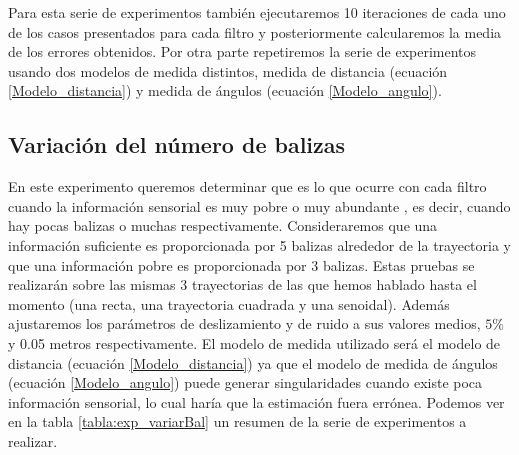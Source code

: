 Para esta serie de experimentos también ejecutaremos 10 iteraciones de cada uno de los casos presentados para cada filtro y posteriormente calcularemos la media de los errores obtenidos.
Por otra parte repetiremos la serie de experimentos usando dos modelos de medida distintos, medida de distancia (ecuación \ref{Modelo_distancia}) y medida de ángulos (ecuación \ref{Modelo_angulo}).

\subsection{Variación del número de balizas }
%
%
%
En este experimento queremos determinar que es lo que ocurre con cada filtro cuando la información sensorial es muy pobre o muy abundante , es decir, cuando hay pocas balizas o muchas respectivamente.
Consideraremos que una información suficiente es proporcionada por 5 balizas alrededor de la trayectoria y que una información pobre es proporcionada por 3 balizas.
Estas pruebas se realizarán sobre las mismas 3 trayectorias de las que hemos hablado hasta el momento (una recta, una trayectoria cuadrada y una senoidal).
Además ajustaremos los parámetros de deslizamiento y de ruido a sus valores medios, $5\%$ y 0.05 metros respectivamente.
El modelo de medida utilizado será el modelo de distancia (ecuación \ref{Modelo_distancia}) ya que el modelo de medida de ángulos (ecuación \ref{Modelo_angulo}) puede generar singularidades cuando existe poca información sensorial, lo cual haría que la estimación fuera errónea.
Podemos ver en la tabla \ref{tabla:exp_variarBal} un resumen de la serie de experimentos a realizar.

